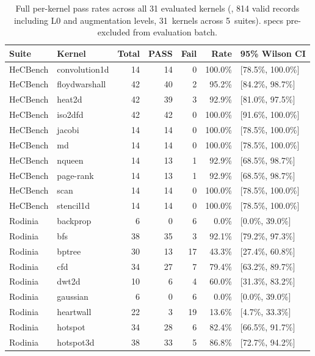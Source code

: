 \begin{table}[t]
\centering
\caption{Full per-kernel pass rates across all 31 evaluated kernels (\codex{}, 814 valid records including L0 and augmentation levels, 31~kernels across 5~suites). \knownfail{} specs pre-excluded from evaluation batch.}
\label{tab:per-kernel-full-codex}
\footnotesize
\begin{tabular}{@{}llrrrrl@{}}
\toprule
Suite & Kernel & Total & PASS & Fail & Rate & 95\% Wilson CI \\
\midrule
HeCBench & convolution1d & 14 & 14 & 0 & 100.0\% & [78.5\%, 100.0\%] \\
HeCBench & floydwarshall & 42 & 40 & 2 & 95.2\% & [84.2\%, 98.7\%] \\
HeCBench & heat2d & 42 & 39 & 3 & 92.9\% & [81.0\%, 97.5\%] \\
HeCBench & iso2dfd & 42 & 42 & 0 & 100.0\% & [91.6\%, 100.0\%] \\
HeCBench & jacobi & 14 & 14 & 0 & 100.0\% & [78.5\%, 100.0\%] \\
HeCBench & md & 14 & 14 & 0 & 100.0\% & [78.5\%, 100.0\%] \\
HeCBench & nqueen & 14 & 13 & 1 & 92.9\% & [68.5\%, 98.7\%] \\
HeCBench & page-rank & 14 & 13 & 1 & 92.9\% & [68.5\%, 98.7\%] \\
HeCBench & scan & 14 & 14 & 0 & 100.0\% & [78.5\%, 100.0\%] \\
HeCBench & stencil1d & 14 & 14 & 0 & 100.0\% & [78.5\%, 100.0\%] \\
\midrule
Rodinia & backprop & 6 & 0 & 6 & 0.0\% & [0.0\%, 39.0\%] \\
Rodinia & bfs & 38 & 35 & 3 & 92.1\% & [79.2\%, 97.3\%] \\
Rodinia & bptree & 30 & 13 & 17 & 43.3\% & [27.4\%, 60.8\%] \\
Rodinia & cfd & 34 & 27 & 7 & 79.4\% & [63.2\%, 89.7\%] \\
Rodinia & dwt2d & 10 & 6 & 4 & 60.0\% & [31.3\%, 83.2\%] \\
Rodinia & gaussian & 6 & 0 & 6 & 0.0\% & [0.0\%, 39.0\%] \\
Rodinia & heartwall & 22 & 3 & 19 & 13.6\% & [4.7\%, 33.3\%] \\
Rodinia & hotspot & 34 & 28 & 6 & 82.4\% & [66.5\%, 91.7\%] \\
Rodinia & hotspot3d & 38 & 33 & 5 & 86.8\% & [72.7\%, 94.2\%] \\

\end{tabular}
\end{table}
